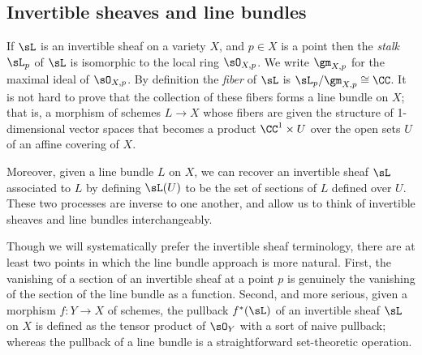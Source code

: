 \subsection{Invertible sheaves and line bundles}

If $\sL$ is an invertible sheaf on a variety $X$, and $p\in X$ is a point then the \emph{stalk} $\sL_p$ of $\sL$ is isomorphic to the local
ring $\sO_{X,p}$. We write $\gm_{X,p}$ for the maximal ideal of $\sO_{X,p}$. By definition the \emph{fiber} of $\sL$ is 
$\sL_p/\gm_{X,p}\cong \CC$. It is not hard to prove that the collection of these fibers forms a line bundle on $X$; that is,
a morphism of schemes $L \to X$ whose fibers are given the structure of 1-dimensional vector spaces that becomes
a product $\CC^1 \times U$ over the open sets $U$ of an affine covering of $X$.

Moreover,
given a line bundle $L$ on $X$, we can recover an invertible sheaf $\sL$ associated to $L$ by defining
$\sL(U)$ to be the set of sections of $L$ defined over $U$. These two processes are inverse to one another, and allow
us to think of invertible sheaves and line bundles interchangeably.

Though we will systematically prefer the invertible sheaf terminology, there are at least two points in which the line bundle approach is more natural. First,  the vanishing of a section of an invertible sheaf at a point $p$ is genuinely the vanishing of the 
section of the line bundle as a function. Second, and more serious, given a morphism $f: Y\to X$ of schemes, the 
pullback $f^*(\sL)$ of an invertible sheaf $\sL$ on $X$ is defined as the tensor product of $\sO_Y$ with a sort of naive pullback; whereas the pullback of a line bundle is a straightforward set-theoretic operation.

% 

